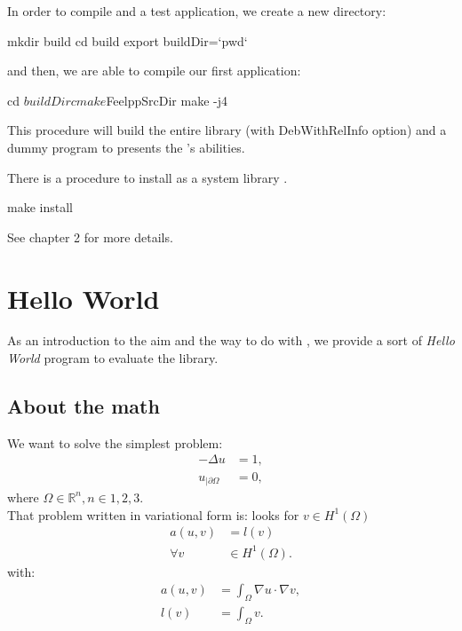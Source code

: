 In order to compile \feel and a test application, we create a new directory:
\begin{unixcom}
  mkdir build
  cd build
  export buildDir=`pwd`
\end{unixcom}

and then, we are able to compile our first application:
\begin{unixcom}
  cd $buildDir
  cmake $FeelppSrcDir
  make -j4
\end{unixcom}

This procedure will build the entire library (with DebWithRelInfo option) and a dummy program to presents the \feel's abilities.

There is a procedure to install as a system library \feel.
\begin{unixcom}
  make install
\end{unixcom}
See chapter 2 for more details.

\section{\feel Hello World}
\label{sec:feel-hello-world}

As an introduction to the aim and the way to do with \feel, we provide a sort of
\textit{Hello World} program to evaluate the library.

\subsection{About the math}
\label{sec:about-math}

We want to solve the simplest problem:
\begin{equation}\nonumber
  \begin{aligned}
    - \Delta u &= 1,\\
    u_{|\partial \Omega} &= 0,
  \end{aligned}
\end{equation}
where $\Omega \in \mathbb{R}^n, n\in{1,2,3}$.\\

That problem written in variational form is:
looks for $v\in H^1\left( \Omega \right)$
\begin{equation}\nonumber
  \begin{aligned}
    a\left( u,v \right)&=l\left( v \right)\\
\forall v &\in H^1\left( \Omega \right).
  \end{aligned}
\end{equation}
with:
\begin{equation}\nonumber
  \begin{aligned}
    a\left( u,v \right)&=\int_{\Omega} \nabla u \cdot \nabla v ,\\
    l\left( v \right) &= \int_{\Omega} v .
  \end{aligned}
\end{equation}

